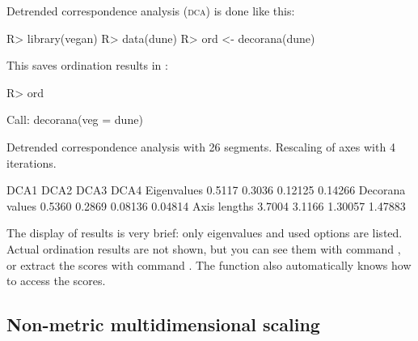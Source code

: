 \documentclass[article,nojss]{jss}
\begin{document}
Detrended correspondence analysis (\textsc{dca}) is done like this:
\begin{Schunk}
\begin{Sinput}
R> library(vegan)
R> data(dune)
R> ord <- decorana(dune)
\end{Sinput}
\end{Schunk}
This saves ordination results in :
\begin{Schunk}
\begin{Sinput}
R> ord
\end{Sinput}
\begin{Soutput}
Call:
decorana(veg = dune) 

Detrended correspondence analysis with 26 segments.
Rescaling of axes with 4 iterations.

                  DCA1   DCA2    DCA3    DCA4
Eigenvalues     0.5117 0.3036 0.12125 0.14266
Decorana values 0.5360 0.2869 0.08136 0.04814
Axis lengths    3.7004 3.1166 1.30057 1.47883
\end{Soutput}
\end{Schunk}
The display of results is very brief: only eigenvalues and used
options are listed.  Actual ordination results are not shown, but you
can see them with command , or extract the scores
with command .  The  function also
automatically knows how to access the scores.

\subsection{Non-metric multidimensional scaling}
\end{document}
